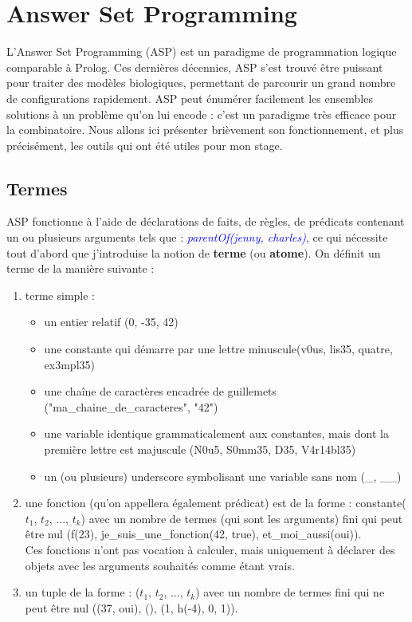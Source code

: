 \documentclass[12pt,a4paper]{article}
\begin{document}
\section{Answer Set Programming}
L'Answer Set Programming (ASP) est un paradigme de programmation logique comparable à Prolog. Ces dernières décennies, ASP s'est trouvé être puissant pour traiter des modèles biologiques, permettant de parcourir un 
grand nombre de configurations rapidement. ASP peut énumérer facilement les ensembles solutions à un problème qu'on lui encode : c'est un paradigme très efficace pour la combinatoire. Nous allons ici présenter brièvement 
son fonctionnement, et plus précisément, les outils qui ont été utiles pour mon stage.
\subsection{Termes}
ASP fonctionne à l'aide de déclarations de faits, de règles, de prédicats contenant un ou plusieurs arguments tels que : \emph{\textcolor{blue}{parentOf(jenny, charles)}}, ce qui nécessite tout d'abord que j'introduise la notion 
de \textbf{terme} (ou \textbf{atome}). On définit un terme de la manière suivante : 
\begin{enumerate}
	\item terme simple :
		\begin{itemize}
		\item un entier relatif (0, -35, 42)
		\item une constante qui démarre par une lettre minuscule(v0us, lis35, quatre, ex3mpl35)
		\item une chaîne de caractères encadrée de guillemets ("ma\_chaine\_de\_caracteres", "42")
		\item une variable identique grammaticalement aux constantes, mais dont la première lettre est majuscule (N0u5, S0mm35, D35, V4r14bl35)
		\item un (ou plusieurs) underscore symbolisant une variable sans nom (\_, \_\_)
		\end{itemize}
	\item une fonction (qu'on appellera également prédicat) est de la forme : constante($t_1$, $t_2$, ..., $t_k$) avec un nombre de termes (qui sont les arguments) fini qui peut être nul (f(23), je\_suis\_une\_fonction(42, 
	true), et\_moi\_aussi(oui)).\\
	Ces fonctions n'ont pas vocation à calculer, mais uniquement à déclarer des objets avec les arguments souhaités comme étant vrais.
	\item un tuple de la forme : ($t_1$, $t_2$, ..., $t_k$) avec un nombre de termes fini qui ne peut être nul ((37, oui), (), (1, h(-4), 0, 1)).
\end{enumerate}
\end{document}
